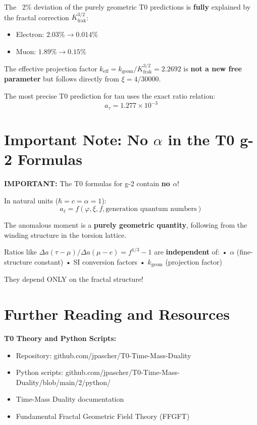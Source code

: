 	\begin{keypoint}
		The ~2\% deviation of the purely geometric T0 predictions is \textbf{fully} explained by the fractal correction $K_\text{frak}^{3/2}$:
		\begin{itemize}
			\item Electron: $2.03\% \to 0.014\%$
			\item Muon: $1.89\% \to 0.15\%$
		\end{itemize}
		
		The effective projection factor $k_\text{eff} = k_\text{geom}/K_\text{frak}^{3/2} = 2.2692$ is \textbf{not a new free parameter} but follows directly from $\xi = 4/30000$.
		
		The most precise T0 prediction for tau uses the exact ratio relation:
		\begin{equation}
			\boxed{a_\tau = 1.277 \times 10^{-3}}
		\end{equation}
	\end{keypoint}
	
	\section{Important Note: No $\alpha$ in the T0 g-2 Formulas}
	
	\textbf{IMPORTANT:}
	The T0 formulas for g-2 contain \textbf{no $\alpha$}!
	
	In natural units ($\hbar = c = \alpha = 1$):
	\[ a_\ell = f(\varphi, \xi, f, \text{generation quantum numbers}) \]
	
	The anomalous moment is a \textbf{purely geometric quantity},
	following from the winding structure in the torsion lattice.
	
	Ratios like $\Delta a(\tau-\mu)/\Delta a(\mu-e) = f^{1/3} - 1$ are
	\textbf{independent} of:
	• $\alpha$ (fine-structure constant)
	• SI conversion factors
	• $k_{\text{geom}}$ (projection factor)
	
	They depend ONLY on the fractal structure!
	
	\section*{Further Reading and Resources}
	
	\textbf{T0 Theory and Python Scripts:}
	\begin{itemize}
		\item Repository: github.com/jpascher/T0-Time-Mass-Duality
		\item Python scripts: github.com/jpascher/T0-Time-Mass-Duality/blob/main/2/python/
		\item Time-Mass Duality documentation
		\item Fundamental Fractal Geometric Field Theory (FFGFT)
	\end{itemize}
	
